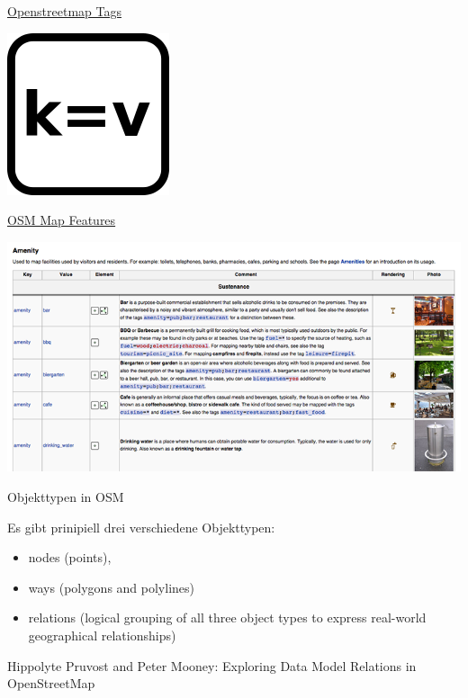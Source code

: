 \documentclass[ignorenonframetext,]{beamer}
\providecommand{\tightlist}{%
  \setlength{\itemsep}{0pt}\setlength{\parskip}{0pt}}
\begin{document}
\begin{frame}{\href{https://wiki.openstreetmap.org/wiki/Tags}{Openstreetmap
Tags}}
\protect\hypertarget{openstreetmap-tags}{}

\includegraphics{figure/osm_tag.png}

\end{frame}

\begin{frame}{\href{http://wiki.openstreetmap.org/wiki/DE:Map_Features}{OSM
Map Features}}
\protect\hypertarget{osm-map-features}{}

\includegraphics{figure/osm_mapfeatures.png}

\end{frame}

\begin{frame}{Objekttypen in OSM}
\protect\hypertarget{objekttypen-in-osm}{}

\begin{block}{Es gibt prinipiell drei verschiedene Objekttypen:}

\begin{itemize}
\tightlist
\item
  nodes (points),
\item
  ways (polygons and polylines)
\item
  relations (logical grouping of all three object types to express
  real-world geographical relationships)
\end{itemize}

Hippolyte Pruvost and Peter Mooney: Exploring Data Model Relations in
OpenStreetMap

\end{block}

\end{frame}
\end{document}
